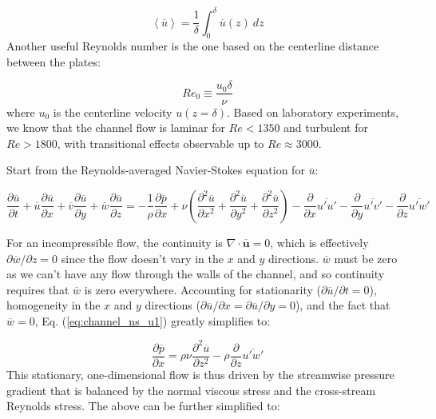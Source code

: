 \documentclass[12pt]{article}
\numberwithin{equation}{section}
\numberwithin{figure}{section}
\numberwithin{table}{section}
\begin{document}
\begin{equation}
  \left< \overline{u}\right> = \frac{1}{\delta} \int_0^{\delta} \overline{u}(z)\ dz
  \label{eq:bulk_velocity}
\end{equation}
Another useful Reynolds number is the one based on the centerline distance
between the plates:

\begin{equation}
  Re_0 \equiv \frac{u_0 \delta}{\nu}
\end{equation}
where $u_0$ is the centerline velocity $u(z=\delta)$.
Based on laboratory experiments, we know that the channel flow is laminar
for $Re < 1350$ and turbulent for $Re > 1800$, with transitional effects
observable up to $Re \approx 3000$.

Start from the Reynolds-averaged Navier-Stokes equation for $\overline{u}$:

\begin{equation}
  \frac{\partial \overline{u}}{\partial t} + 
  \overline{u} \frac{\partial \overline{u}}{\partial x} + 
  \overline{v} \frac{\partial \overline{u}}{\partial y} + 
  \overline{w} \frac{\partial \overline{u}}{\partial z} =
  - \frac{1}{\rho} \frac{\partial \overline{p}}{\partial x} +
  \nu \left( \frac{\partial^2 \overline{u}}{\partial x^2} +
  \frac{\partial^2 \overline{u}}{\partial y^2} +
  \frac{\partial^2 \overline{u}}{\partial z^2} \right)
  - \frac{\partial}{\partial x}\overline{u'u'}
  - \frac{\partial}{\partial y}\overline{u'v'}
  - \frac{\partial}{\partial z}\overline{u'w'}
  \label{eq:channel_ns_u1}
\end{equation}

For an incompressible flow, the continuity is $\nabla \cdot \overline{\mathbf{u}} = 0$,
which is effectively $\partial \overline{w}/\partial z = 0$ since the flow
doesn't vary in the $x$ and $y$ directions.
$\overline{w}$ must be zero as we can't have any flow through the walls of the channel,
and so continuity requires that $\overline{w}$ is zero everywhere.
Accounting for stationarity ($\partial \overline{u}/\partial t = 0$),
homogeneity in the $x$ and $y$ directions
($\partial \overline{u}/\partial x = \partial \overline{u}/\partial y = 0$),
and the fact that $\overline{w} = 0$, Eq. (\ref{eq:channel_ns_u1}) greatly
simplifies to:

\begin{equation}
  \frac{\partial \overline{p}}{\partial x} =
  \rho \nu \frac{\partial^2 \overline{u}}{\partial z^2} -
  \rho \frac{\partial}{\partial z}\overline{u'w'}
\end{equation}
This stationary, one-dimensional flow is thus driven by the streamwise pressure
gradient that is balanced by the normal viscous stress and the cross-stream
Reynolds stress.
The above can be further simplified to:
\end{document}
